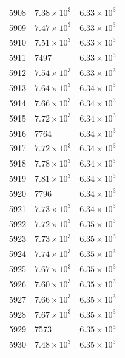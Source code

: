 \begin{table}[H]
\begin{tabular}{lll}
5908 & $\displaystyle 7.38 \times 10^{3}$ & $\displaystyle 6.33 \times 10^{3}$ \\
5909 & $\displaystyle 7.47 \times 10^{3}$ & $\displaystyle 6.33 \times 10^{3}$ \\
5910 & $\displaystyle 7.51 \times 10^{3}$ & $\displaystyle 6.33 \times 10^{3}$ \\
5911 & 7497 & $\displaystyle 6.33 \times 10^{3}$ \\
5912 & $\displaystyle 7.54 \times 10^{3}$ & $\displaystyle 6.33 \times 10^{3}$ \\
5913 & $\displaystyle 7.64 \times 10^{3}$ & $\displaystyle 6.34 \times 10^{3}$ \\
5914 & $\displaystyle 7.66 \times 10^{3}$ & $\displaystyle 6.34 \times 10^{3}$ \\
5915 & $\displaystyle 7.72 \times 10^{3}$ & $\displaystyle 6.34 \times 10^{3}$ \\
5916 & 7764 & $\displaystyle 6.34 \times 10^{3}$ \\
5917 & $\displaystyle 7.72 \times 10^{3}$ & $\displaystyle 6.34 \times 10^{3}$ \\
5918 & $\displaystyle 7.78 \times 10^{3}$ & $\displaystyle 6.34 \times 10^{3}$ \\
5919 & $\displaystyle 7.81 \times 10^{3}$ & $\displaystyle 6.34 \times 10^{3}$ \\
5920 & 7796 & $\displaystyle 6.34 \times 10^{3}$ \\
5921 & $\displaystyle 7.73 \times 10^{3}$ & $\displaystyle 6.34 \times 10^{3}$ \\
5922 & $\displaystyle 7.72 \times 10^{3}$ & $\displaystyle 6.35 \times 10^{3}$ \\
5923 & $\displaystyle 7.73 \times 10^{3}$ & $\displaystyle 6.35 \times 10^{3}$ \\
5924 & $\displaystyle 7.74 \times 10^{3}$ & $\displaystyle 6.35 \times 10^{3}$ \\
5925 & $\displaystyle 7.67 \times 10^{3}$ & $\displaystyle 6.35 \times 10^{3}$ \\
5926 & $\displaystyle 7.60 \times 10^{3}$ & $\displaystyle 6.35 \times 10^{3}$ \\
5927 & $\displaystyle 7.66 \times 10^{3}$ & $\displaystyle 6.35 \times 10^{3}$ \\
5928 & $\displaystyle 7.67 \times 10^{3}$ & $\displaystyle 6.35 \times 10^{3}$ \\
5929 & 7573 & $\displaystyle 6.35 \times 10^{3}$ \\
5930 & $\displaystyle 7.48 \times 10^{3}$ & $\displaystyle 6.35 \times 10^{3}$ \\

\end{tabular}
\end{table}
